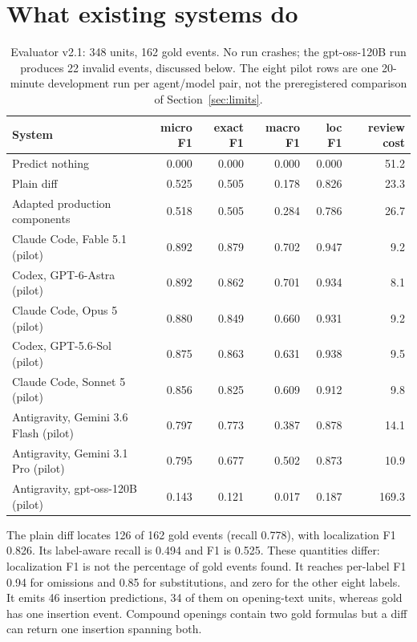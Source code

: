 \documentclass{article}
\begin{document}
\section{What existing systems do}
\begin{table}[h]\centering\footnotesize\setlength{\tabcolsep}{4pt}
\begin{tabular}{lrrrrr}\toprule
System & micro F1 & exact F1 & macro F1 & loc F1 & review cost\\\midrule
Predict nothing & 0.000 & 0.000 & 0.000 & 0.000 & 51.2 \\
Plain diff & 0.525 & 0.505 & 0.178 & 0.826 & 23.3 \\
Adapted production components & 0.518 & 0.505 & 0.284 & 0.786 & 26.7 \\
Claude Code, Fable 5.1 (pilot) & 0.892 & 0.879 & 0.702 & 0.947 & 9.2 \\
Codex, GPT-6-Astra (pilot) & 0.892 & 0.862 & 0.701 & 0.934 & 8.1 \\
Claude Code, Opus 5 (pilot) & 0.880 & 0.849 & 0.660 & 0.931 & 9.2 \\
Codex, GPT-5.6-Sol (pilot) & 0.875 & 0.863 & 0.631 & 0.938 & 9.5 \\
Claude Code, Sonnet 5 (pilot) & 0.856 & 0.825 & 0.609 & 0.912 & 9.8 \\
Antigravity, Gemini 3.6 Flash (pilot) & 0.797 & 0.773 & 0.387 & 0.878 & 14.1 \\
Antigravity, Gemini 3.1 Pro (pilot) & 0.795 & 0.677 & 0.502 & 0.873 & 10.9 \\
Antigravity, gpt-oss-120B (pilot) & 0.143 & 0.121 & 0.017 & 0.187 & 169.3 \\
\bottomrule
\end{tabular}
\caption{Evaluator v2.1: 348 units, 162 gold events. No run crashes; the gpt-oss-120B run produces 22 invalid events, discussed below. The eight pilot rows are one 20-minute development run per agent/model pair, not the preregistered comparison of Section~\ref{sec:limits}.}
\end{table}

The plain diff locates 126 of 162 gold events (recall 0.778), with localization F1 0.826. Its label-aware recall is 0.494 and F1 is 0.525. These quantities differ: localization F1 is not the percentage of gold events found. It reaches per-label F1 0.94 for omissions and 0.85 for substitutions, and zero for the other eight labels. It emits 46 insertion predictions, 34 of them on opening-text units, whereas gold has one insertion event. Compound openings contain two gold formulas but a diff can return one insertion spanning both.
\end{document}
